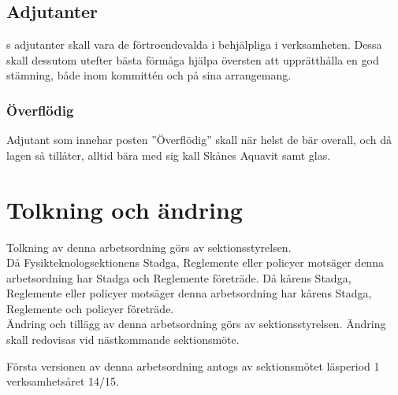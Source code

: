 \subsection{Adjutanter}
\forening s adjutanter skall vara de förtroendevalda i \forening  behjälpliga i verksamheten. Dessa skall dessutom utefter bästa förmåga hjälpa översten att upprätthålla en god stämning, både inom kommittén och på sina arrangemang.

\subsubsection{Överflödig }
Adjutant som innehar posten ''Överflödig'' skall när helst de bär overall, och då lagen så tillåter, alltid bära med sig kall Skånes Aquavit samt glas.

\section{Tolkning och ändring}
Tolkning av denna arbetsordning görs av sektionsstyrelsen.\\ Då Fysikteknologsektionens Stadga, Reglemente eller policyer motsäger denna arbetsordning har Stadga och Reglemente företräde. Då kårens Stadga, Reglemente eller policyer motsäger denna arbetsordning har kårens Stadga, Reglemente och policyer företräde.\\
Ändring och tillägg av denna arbetsordning görs av sektionsstyrelsen. Ändring skall redovisas vid nästkommande sektionsmöte. 


Första versionen av denna arbetsordning antogs av sektionsmötet läsperiod 1 verksamhetsåret 14/15.

\newpage
